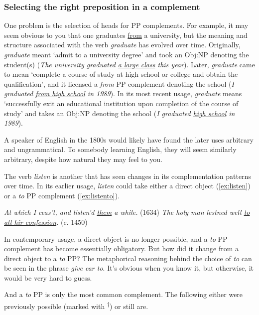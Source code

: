 \subsubsection*{Selecting the right preposition in a complement}

One problem is the selection of heads for PP complements. For example, it may seem obvious to you that one graduates \uline{from} a university, but the meaning and structure associated with the verb \textit{graduate} has evolved over time. Originally, \textit{graduate} meant `admit to a university degree' and took an Obj:NP denoting the student(s) (\textit{The university graduated \uline{a large class} this year}). Later, \textit{graduate} came to mean `complete a course of study at high school or college and obtain the qualification', and it licensed a \textit{from} PP complement denoting the school (\textit{I graduated \uline{from high school} in 1989}). In its most recent usage, \textit{graduate} means `successfully exit an educational institution upon completion of the course of study' and takes an Obj:NP denoting the school (\textit{I graduated \uline{high school} in 1989}).

A speaker of English in the 1800s would likely have found the later uses arbitrary and ungrammatical. To somebody learning English, they will seem similarly arbitrary, despite how natural they may feel to you.

The verb \textit{listen} is another that has seen changes in its complementation patterns over time. In its earlier usage, \textit{listen} could take either a direct object (\ref{ex:listen}) or a \textit{to} PP complement (\ref{ex:listento}).

\ea \textit{At which I ceas't, and listen'd \uline{them} a while.} (1634)\label{ex:listen}
\z
\ea \textit{The holy man lestned well \uline{to all hir confession}.} (c. 1450)\label{ex:listento}
\z
    
In contemporary usage, a direct object is no longer possible, and a \textit{to} PP complement has become essentially obligatory. But how did it change from a direct object to a \textit{to} PP? The metaphorical reasoning behind the choice of \textit{to} can be seen in the phrase \textit{give ear to}. It's obvious when you know it, but otherwise, it would be very hard to guess. 

And a \textit{to} PP is only the most common complement. The following either were previously possible (marked with \textsuperscript{†}) or still are.

